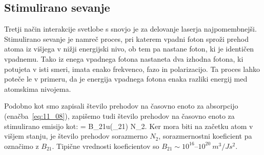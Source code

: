 \subsection*{Stimulirano sevanje}
Tretji način interakcije svetlobe s snovjo je za delovanje laserja
najpomembnejši. Stimulirano sevanje je namreč proces, pri katerem 
vpadni foton sproži prehod atoma iz višjega
v nižji energijski nivo, ob tem pa nastane foton, ki je identičen vpadnemu.
Tako iz enega vpadnega fotona nastaneta dva izhodna fotona, ki potujeta
v isti smeri, imata enako frekvenco, fazo in polarizacijo. Ta proces lahko
poteče le v primeru, da je energija vpadnega fotona enaka razliki energij 
med atomskima nivojema.

Podobno kot smo zapisali število prehodov na časovno enoto za absorpcijo 
(enačba~\ref{eq:11_08}), zapišemo tudi število prehodov na časovno enoto 
za stimulirano emisijo kot:
\beq
{} = B_{21}u(\omega_{21}) N_2.
\label{eq:11_12}
\eeq
Ker mora biti na začetku atom v višjem stanju, je število prehodov sorazmerno
$N_2$, sorazmernostni koeficient pa označimo z $B_{21}$. Tipične vrednosti
koeficientov so $B_{21}\sim 10^{16}$--$10^{20}~\si{m^3/Js^2}$.

